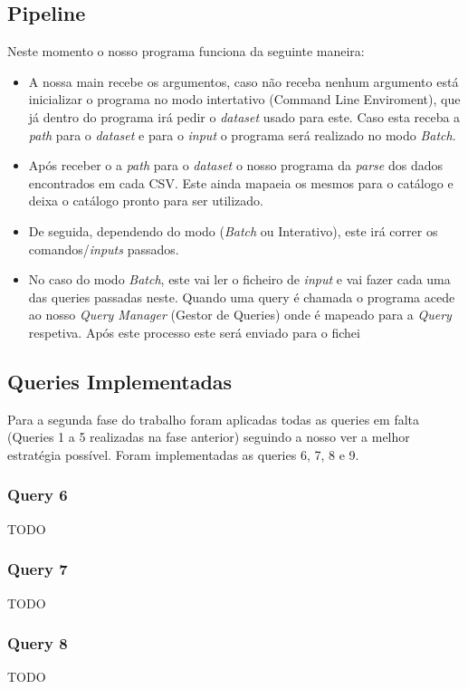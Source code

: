 \documentclass{article}
\begin{document}
    \subsection{Pipeline}
        Neste momento o nosso programa funciona da seguinte maneira:
        \begin{itemize}
            \item A nossa main recebe os argumentos, caso não receba nenhum 
            argumento está inicializar o programa no modo intertativo (Command Line Enviroment), 
            que já dentro do programa irá pedir o \emph{dataset} usado para este. Caso esta 
            receba a \emph{path} para o \emph{dataset} e para o \emph{input} o programa será 
            realizado no modo \emph{Batch}.
            \item Após receber o a \emph{path} para o \emph{dataset} o nosso programa da 
            \emph{parse} dos dados encontrados em cada CSV. Este ainda mapaeia os mesmos
             para o catálogo e deixa o catálogo pronto para ser utilizado.
            \item De seguida, dependendo do modo (\emph{Batch} ou Interativo), este irá 
            correr os comandos/\emph{inputs} passados.
            \item No caso do modo \emph{Batch}, este vai ler o ficheiro de \emph{input} e 
            vai fazer cada uma das queries passadas neste. Quando uma query é chamada o programa acede ao nosso \emph{Query Manager} (Gestor de Queries) onde é mapeado para a \emph{Query} respetiva. Após este processo este será enviado para o fichei
        \end{itemize}
    \subsection{Queries Implementadas}
        Para a segunda fase do trabalho foram aplicadas todas as queries em falta
        (Queries 1 a 5 realizadas na fase anterior) seguindo a nosso ver a melhor
        estratégia possível. Foram implementadas as queries 6, 7, 8 e 9.
        \subsubsection{Query 6}
            TODO
        \subsubsection{Query 7}
            TODO
        \subsubsection{Query 8}
            TODO
\end{document}
